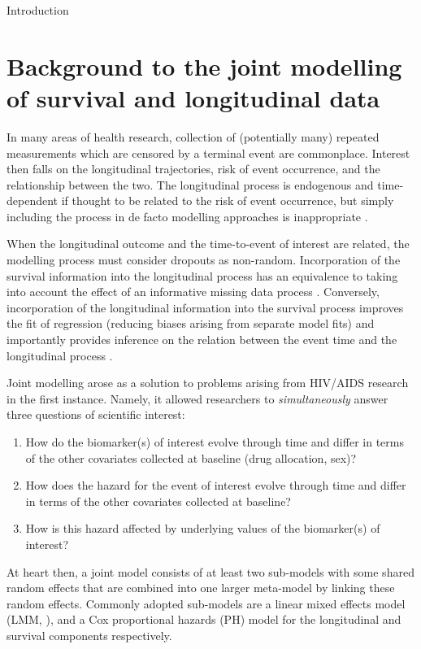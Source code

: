 \begin{chapter}{\label{cha:intro}Introduction}

  \section{\label{sec:jointintro}Background to the joint modelling of survival and longitudinal data}
  In many areas of health research, collection of (potentially many) repeated measurements which are censored by a terminal event are commonplace. Interest then falls on the longitudinal trajectories, risk of event occurrence, and the relationship between the two. The longitudinal process is endogenous and time-dependent if thought to be related to the risk of event occurrence, but simply including the process in de facto modelling approaches is inappropriate \citep{Prentice1982, Kalbfleisch2002, Sweeting2011}.
  
  When the longitudinal outcome and the time-to-event of interest are related, the modelling process must consider dropouts as non-random. Incorporation of the survival information into the longitudinal process has an equivalence to taking into account the effect of an informative missing data process \citep{Sweeting2011}. Conversely, incorporation of the longitudinal information into the survival process improves the fit of regression (\ie reducing biases arising from separate model fits) and importantly provides inference on the relation between the event time and the longitudinal process \citep{Wulfsohn97,Sweeting2011}.

  Joint modelling arose as a solution to problems arising from HIV/AIDS research in the first instance. Namely, it allowed researchers to \textit{simultaneously} answer three questions of scientific interest:
  \begin{enumerate}
      \item How do the biomarker(s) of interest evolve through time and differ in terms of the other covariates collected at baseline (\eg drug allocation, sex)?
      \item How does the hazard for the event of interest evolve through time and differ in terms of the other covariates collected at baseline?
      \item How is this hazard affected by underlying values of the biomarker(s) of interest?
  \end{enumerate}
  At heart then, a joint model consists of at least two sub-models with some shared random effects that are combined into one larger meta-model by linking these random effects. Commonly adopted sub-models are a linear mixed effects model (LMM, \citet{LairdWare1982}), and a Cox proportional hazards (PH) model \citep{Cox1972} for the longitudinal and survival components respectively.


\end{chapter}
